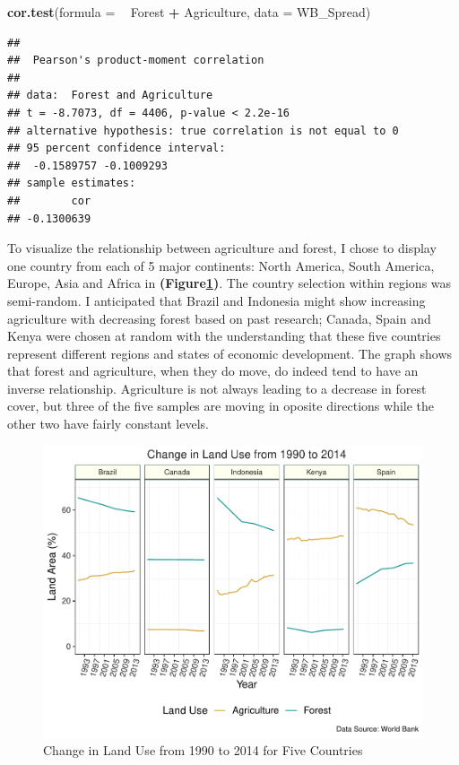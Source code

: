 \documentclass[12pt,]{article}
\newenvironment{Shaded}{\begin{snugshade}}{\end{snugshade}}
\newcommand{\KeywordTok}[1]{\textcolor[rgb]{0.13,0.29,0.53}{\textbf{#1}}}
\newcommand{\DataTypeTok}[1]{\textcolor[rgb]{0.13,0.29,0.53}{#1}}
\newcommand{\StringTok}[1]{\textcolor[rgb]{0.31,0.60,0.02}{#1}}
\newcommand{\OperatorTok}[1]{\textcolor[rgb]{0.81,0.36,0.00}{\textbf{#1}}}
\newcommand{\NormalTok}[1]{#1}
\begin{document}
\begin{Shaded}
\begin{Highlighting}[]
\KeywordTok{cor.test}\NormalTok{(}\DataTypeTok{formula =} \OperatorTok{~}\StringTok{ }\NormalTok{Forest }\OperatorTok{+}\StringTok{ }\NormalTok{Agriculture,}
         \DataTypeTok{data =}\NormalTok{ WB_Spread)}
\end{Highlighting}
\end{Shaded}

\begin{verbatim}
## 
##  Pearson's product-moment correlation
## 
## data:  Forest and Agriculture
## t = -8.7073, df = 4406, p-value < 2.2e-16
## alternative hypothesis: true correlation is not equal to 0
## 95 percent confidence interval:
##  -0.1589757 -0.1009293
## sample estimates:
##        cor 
## -0.1300639
\end{verbatim}

To visualize the relationship between agriculture and forest, I chose to
display one country from each of 5 major continents: North America,
South America, Europe, Asia and Africa in
\textbf{(Figure\ref{fig:fig4})}. The country selection within regions
was semi-random. I anticipated that Brazil and Indonesia might show
increasing agriculture with decreasing forest based on past research;
Canada, Spain and Kenya were chosen at random with the understanding
that these five countries represent different regions and states of
economic development. The graph shows that forest and agriculture, when
they do move, do indeed tend to have an inverse relationship.
Agriculture is not always leading to a decrease in forest cover, but
three of the five samples are moving in oposite directions while the
other two have fairly constant levels.

\begin{figure}
\centering
\includegraphics{Marx_ENV872_Project_files/figure-latex/unnamed-chunk-7-1.pdf}
\caption{\label{fig:fig4}Change in Land Use from 1990 to 2014 for Five
Countries}
\end{figure}
\end{document}
